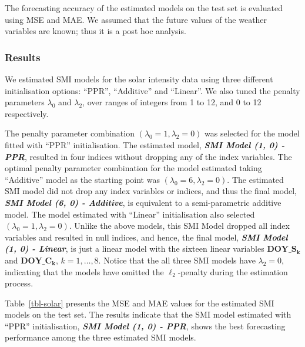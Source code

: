 \documentclass[
  11pt,
  a4paper,
]{article}
\begin{document}
The forecasting accuracy of the estimated models on the test set is
evaluated using MSE and MAE. We assumed that the future values of the
weather variables are known; thus it is a post hoc analysis.

\subsubsection{Results}\label{results-1}

We estimated SMI models for the solar intensity data using three
different initialisation options: ``PPR'', ``Additive'' and ``Linear''.
We also tuned the penalty parameters \(\lambda_{0}\) and
\(\lambda_{2}\), over ranges of integers from 1 to 12, and 0 to 12
respectively.

The penalty parameter combination \((\lambda_{0} = 1, \lambda_{2} = 0)\)
was selected for the model fitted with ``PPR'' initialisation. The
estimated model, \textbf{\emph{SMI Model (1, 0) - PPR}}, resulted in
four indices without dropping any of the index variables. The optimal
penalty parameter combination for the model estimated taking
``Additive'' model as the starting point was
\((\lambda_{0} = 6, \lambda_{2} = 0)\). The estimated SMI model did not
drop any index variables or indices, and thus the final model,
\textbf{\emph{SMI Model (6, 0) - Additive}}, is equivalent to a
semi-parametric additive model. The model estimated with ``Linear''
initialisation also selected \((\lambda_{0} = 1, \lambda_{2} = 0)\).
Unlike the above models, this SMI Model dropped all index variables and
resulted in null indices, and hence, the final model, \textbf{\emph{SMI
Model (1, 0) - Linear}}, is just a linear model with the sixteen linear
variables \(\textbf{DOY}\_\textbf{S}_{\bm{k}}\) and
\(\textbf{DOY}\_\textbf{C}_{\bm{k}}\), \(k = 1, \dots, 8\). Notice that
the all three SMI models have \(\lambda_{2} = 0\), indicating that the
models have omitted the \(\ell_{2}\)-penalty during the estimation
process.

Table~\ref{tbl-solar} presents the MSE and MAE values for the estimated
SMI models on the test set. The results indicate that the SMI model
estimated with ``PPR'' initialisation, \textbf{\emph{SMI Model (1, 0) -
PPR}}, shows the best forecasting performance among the three estimated
SMI models.
\end{document}
